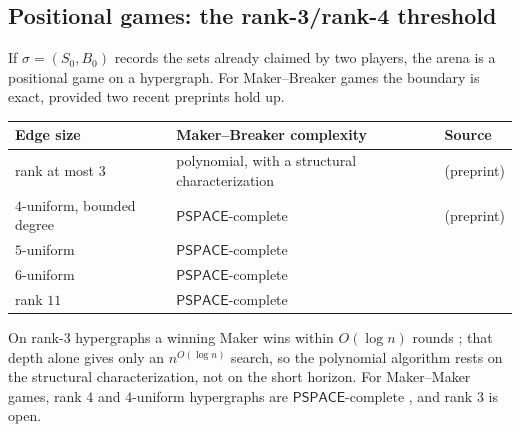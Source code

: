 \documentclass[11pt]{amsart}
\theoremstyle{plain}
\theoremstyle{definition}
\theoremstyle{remark}
\numberwithin{equation}{section}
\newcommand{\cls}[1]{\mathsf{#1}}
\newcommand{\PSPACE}{\cls{PSPACE}}
\begin{document}
\subsection{Positional games: the rank-3/rank-4 threshold}\label{ssec:positional}
If $\sigma=(S_0,B_0)$ records the sets already claimed by two players, the arena is a positional game on a hypergraph. For Maker--Breaker games the boundary is exact, provided two recent preprints hold up.
\begin{center}\small
\begin{tabularx}{\linewidth}{@{}l>{\raggedright\arraybackslash}Xl@{}}
\toprule
Edge size & Maker--Breaker complexity & Source\\ \midrule
rank at most $3$ & polynomial, with a structural characterization & \cite{GGS} (preprint)\\
$4$-uniform, bounded degree & $\PSPACE$-complete & \cite{Galliot25} (preprint)\\
$5$-uniform & $\PSPACE$-complete & \cite{Koepke}\\
$6$-uniform & $\PSPACE$-complete & \cite{RahmanWatson}\\
rank $11$ & $\PSPACE$-complete & \cite{SchaeferGames}\\
\bottomrule
\end{tabularx}
\end{center}
On rank-$3$ hypergraphs a winning Maker wins within $O(\log n)$ rounds \cite{GGS}; that depth alone gives only an $n^{O(\log n)}$ search, so the polynomial algorithm rests on the structural characterization, not on the short horizon. For Maker--Maker games, rank $4$ and $4$-uniform hypergraphs are $\PSPACE$-complete \cite{GalliotSenizergues,Galliot25}, and rank $3$ is open.
\end{document}
